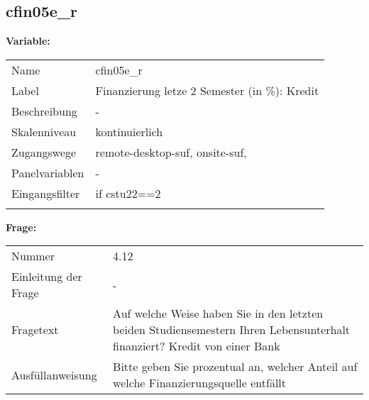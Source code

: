 	
	
	\subsection{cfin05e\_r}
	\label{subSection:cfin05e_r}

	\noindent\textbf{Variable:}\\
		\begin{tabular}{lL{11.3cm}}
			\label{tableVariable:cfin05e_r}
			Name & cfin05e\_r \\
			Label & Finanzierung letze 2 Semester (in \%): Kredit \\
			Beschreibung & - \\
			Skalenniveau & kontinuierlich \\
			Zugangswege &
				remote-desktop-suf,
				onsite-suf,
 \\
			Panelvariablen & -
			 \\
			Eingangsfilter & if cstu22==2 \\
 \\
		\end{tabular}

		\vspace*{1 cm}
		\noindent\textbf{Frage:}\\
		\begin{tabular}{lL{11.3cm}}
			\label{tableQuestion:cfin05e_r}
			Nummer & 4.12 \\
			Einleitung der Frage & - \\
			Fragetext & Auf welche Weise haben Sie in den letzten beiden Studiensemestern Ihren Lebensunterhalt finanziert?
Kredit von einer Bank \\
			Ausfüllanweisung & Bitte geben Sie prozentual an, welcher Anteil auf welche Finanzierungsquelle entfällt \\
		\end{tabular}




